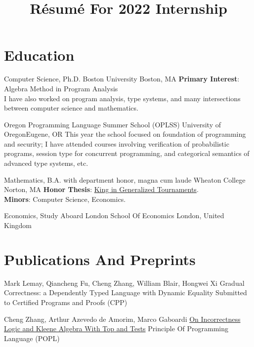 \documentclass[11pt,roman]{moderncv}        %
\title{Résumé For 2022 Internship}
\begin{document}

\makecvtitle{}

\setlength{\parskip}{2.5px}
\linespread{1.3}
\selectfont


\section{Education}

{Computer Science, Ph.D.} {}
{Boston University}
{Boston, MA}
{\textbf{Primary Interest}: Algebra Method in Program Analysis\\
I have also worked on program analysis, type systems,
and many intersections between computer science and mathematics.}  %

{Oregon Programming Language Summer School (OPLSS)}{}
{University of Oregon}{Eugene, OR}
{This year the school focused on foundation of programming and security;
I have attended courses involving verification of probabilistic programs,
session type for concurrent programming, 
and categorical semantics of advanced type systems, etc.}

{Mathematics, B.A.} {with department honor, magna cum laude}
{Wheaton College}
{Norton, MA}
{\textbf{Honor Thesis}: \href{http://hdl.handle.net/11040/24570}{King in Generalized Tournaments}.\\
\textbf{Minors}: Computer Science, Economics.
}

{Economics, Study Aboard} {}
{London School Of Economics}
{London, United Kingdom}
{}  %



\section{Publications And Preprints}


{Mark Lemay, Qiancheng Fu, Cheng Zhang, William Blair, Hongwei Xi}
{Gradual Correctness: a Dependently Typed Language with Dynamic Equality}
{Submitted to Certified Programs and Proofs (CPP)}{}{}

{Cheng Zhang, Arthur Azevedo de Amorim, Marco Gaboardi}
{\href{https://arxiv.org/abs/2108.07707}{On Incorrectness Logic and Kleene Algebra With Top and Tests}}
{Principle Of Programming Language (POPL)}
{}{}
\end{document}
